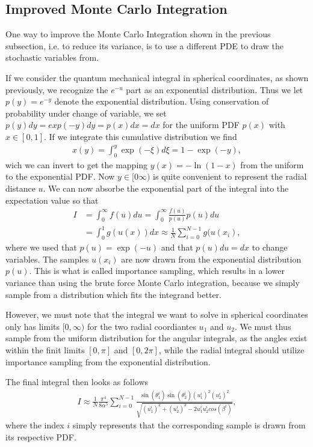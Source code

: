 \documentclass[twocolumn]{aastex62}
\begin{document}
\subsection{Improved Monte Carlo Integration}
One way to improve the Monte Carlo Integration shown in the previous subsection, i.e. to reduce its variance, is to use a different PDE to draw the stochastic variables from.

If we consider the quantum mechanical integral in spherical coordinates, as shown previously, we recognize the $e^{-u}$ part as an exponential distribution. Thus we let $p(y) = e^{-y}$ denote the exponential distribution. Using conservation of probability under change of variable, we set $p(y)dy = exp(-y)dy = p(x)dx = dx$ for the uniform PDF $p(x)$ with $x\in[0,1]$. If we integrate this cumulative distribution we find 
\begin{align}
	x(y) = \int^y_0 \exp(-\xi)d\xi = 1 - \exp(-y),
\end{align} 
wich we can invert to get the mapping $y(x) = -\ln(1-x)$ from the uniform to the exponential PDF. Now $y\in[0\infty)$ is quite convenient to represent the radial distance $u$. We can now absorbe the exponential part of the integral into the expectation value so that 
\begin{align}
	I &= \int^\infty_0 f(u)du = \int_0^\infty \frac{f(u)}{p(u)}p(u)du \\
	&= \int^1_0 g(u(x))dx \approx \frac{1}{N}\sum_{i=0}^{N-1} g(u(x_i), 
\end{align}
where we used that $p(u) = \exp(-u)$ and that $p(u)du = dx$ to change variables. The samples $u(x_i)$ are now drawn from the exponential distribution $p(u)$. This is what is called importance sampling, which results in a lower variance than using the brute force Monte Carlo integration, because we simply sample from a distribution which fits the integrand better. 

However, we must note that the integral we want to solve in spherical coordinates only has limits $[0, \infty)$ for the two radial coordiantes $u_1$ and $u_2$. We must thus sample from the uniform distribution for the angular integrals, as the angles exist within the finit limits $[0,\pi]$ and $[0, 2\pi]$, while the radial integral should utilize importance sampling from the exponential distribution.

The final integral then looks as follows
\begin{align}
	I \approx \frac{1}{N}\frac{\pi^4}{8\alpha^5}\sum^{N-1}_{i=0}\frac{\sin
	(\theta_1^i)\sin(\theta_2^i)(u_1^i)^2(u_2^i)^2}{\sqrt{(u_1^i)^2 + (u_2^i)^2 - 2u_1^iu_2^icos(\beta^i)}},
\end{align}
where the index $i$ simply represents that the corresponding sample is drawn from its respective PDF.
\end{document}
